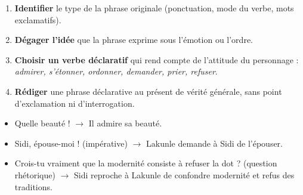 \documentclass[11pt]{article}
\begin{document}
\begin{methode}
\begin{enumerate}
\item \textbf{Identifier} le type de la phrase originale (ponctuation, mode du verbe, mots exclamatifs).
\item \textbf{Dégager l'idée} que la phrase exprime sous l'émotion ou l'ordre.
\item \textbf{Choisir un verbe déclaratif} qui rend compte de l'attitude du personnage : \emph{admirer, s'étonner, ordonner, demander, prier, refuser}.
\item \textbf{Rédiger} une phrase déclarative au présent de vérité générale, sans point d'exclamation ni d'interrogation.
\end{enumerate}
\end{methode}

\begin{exemplebox}
\begin{itemize}
\item \og Quelle beauté ! \fg{} $\rightarrow$ \og Il admire sa beauté. \fg
\item \og Sidi, épouse-moi ! \fg{} (impérative) $\rightarrow$ \og Lakunle demande à Sidi de l'épouser. \fg
\item \og Crois-tu vraiment que la modernité consiste à refuser la dot ? \fg{} (question rhétorique) $\rightarrow$ \og Sidi reproche à Lakunle de confondre modernité et refus des traditions. \fg
\end{itemize}
\end{exemplebox}
\end{document}
